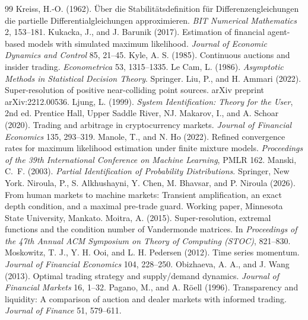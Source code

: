 \documentclass[12pt]{article}
\theoremstyle{definition}
\theoremstyle{remark}
\begin{document}
\begin{thebibliography}{99}
 Kreiss, H.-O. (1962). \"Uber die Stabilit\"atsdefinition f\"ur Differenzengleichungen die partielle Differentialgleichungen approximieren. \emph{BIT Numerical Mathematics} 2, 153--181.
 Kukacka, J., and J. Barunik (2017). Estimation of financial agent-based models with simulated maximum likelihood. \emph{Journal of Economic Dynamics and Control} 85, 21--45.
 Kyle, A. S. (1985). Continuous auctions and insider trading. \emph{Econometrica} 53, 1315--1335.
 Le Cam, L. (1986). \emph{Asymptotic Methods in Statistical Decision Theory}. Springer.
 Liu, P., and H. Ammari (2022). Super-resolution of positive near-colliding point sources. arXiv preprint arXiv:2212.00536.
 Ljung, L. (1999). \emph{System Identification: Theory for the User}, 2nd ed. Prentice Hall, Upper Saddle River, NJ.
 Makarov, I., and A. Schoar (2020). Trading and arbitrage in cryptocurrency markets. \emph{Journal of Financial Economics} 135, 293--319.
 Manole, T., and N. Ho (2022). Refined convergence rates for maximum likelihood estimation under finite mixture models. \emph{Proceedings of the 39th International Conference on Machine Learning}, PMLR 162.
 Manski, C.~F. (2003). \emph{Partial Identification of Probability Distributions}. Springer, New York.
 Niroula, P., S. Alkhushayni, Y. Chen, M. Bhavsar, and P. Niroula (2026). From human markets to machine markets: Transient amplification, an exact depth condition, and a maximal pre-trade guard. Working paper, Minnesota State University, Mankato.
 Moitra, A. (2015). Super-resolution, extremal functions and the condition number of Vandermonde matrices. In \emph{Proceedings of the 47th Annual ACM Symposium on Theory of Computing (STOC)}, 821--830.
 Moskowitz, T. J., Y. H. Ooi, and L. H. Pedersen (2012). Time series momentum. \emph{Journal of Financial Economics} 104, 228--250.
 Obizhaeva, A. A., and J. Wang (2013). Optimal trading strategy and supply/demand dynamics. \emph{Journal of Financial Markets} 16, 1--32.
 Pagano, M., and A. R\"oell (1996). Transparency and liquidity: A comparison of auction and dealer markets with informed trading. \emph{Journal of Finance} 51, 579--611.

\end{thebibliography}
\end{document}
